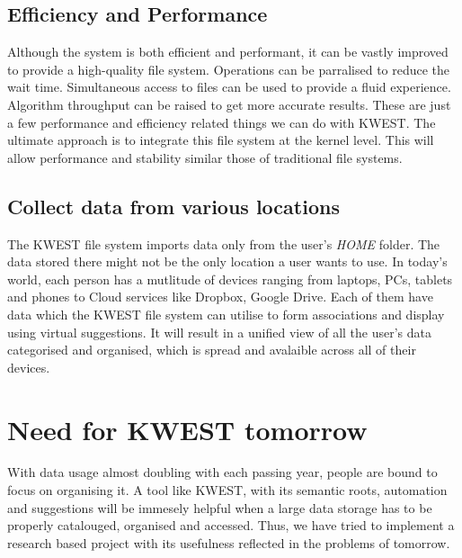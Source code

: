 \subsection*{Efficiency and Performance}
Although the system is both efficient and performant, it can be vastly improved to provide a high-quality file system. Operations can be parralised to reduce the wait time. Simultaneous access to files can be used to provide a fluid experience. Algorithm throughput can be raised to get more accurate results. These are just a few performance and efficiency related things we can do with KWEST. The ultimate approach is to integrate this file system at the kernel level. This will allow performance and stability similar those of traditional file systems.

\subsection*{Collect data from various locations}
The KWEST file system imports data only from the user's \textit{HOME} folder. The data stored there might not be the only location a user wants to use. In today's world, each person has a mutlitude of devices ranging from laptops, PCs, tablets and phones to Cloud services like Dropbox, Google Drive. Each of them have data which the KWEST file system can utilise to form associations and display using virtual suggestions. It will result in a unified view of all the user's data categorised and organised, which is spread and avalaible across all of their devices.

\section{Need for KWEST tomorrow}
With data usage almost doubling with each passing year, people are bound to focus on organising it. A tool like KWEST,  with its semantic roots, automation and suggestions will be immesely helpful when a large data storage has to be properly catalouged, organised and accessed. Thus, we have tried to implement a research based project with its usefulness reflected in the problems of tomorrow.